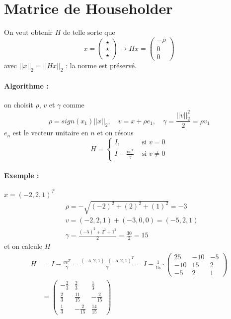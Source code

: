 \documentclass[a4paper,9pt]{extarticle}
\begin{document}
\section{Matrice de Householder}

On veut obtenir $H$ de telle sorte que
$$
x = \begin{pmatrix}
\star \\ \star \\ \star
\end{pmatrix}
\rightarrow
Hx = \begin{pmatrix}
-\rho \\ 0 \\ 0
\end{pmatrix}
$$
avec $||x||_2 = ||Hx||_2$ : la norme est préservé.

\paragraph*{Algorithme : } on choisit $\rho$, $v$ et $\gamma$ comme
$$
\rho = sign(x_1)||x||_2, \quad v = x + \rho e_1,\quad \gamma = \frac{||v||^2_2}{2} = \rho v_1
$$
$e_n$ est le vecteur unitaire en $n$ et on résous
$$
H = \begin{cases}
I, &\text{ si } v = 0 \\
I - \frac{vv^T}{\gamma} &\text{ si }v \neq 0
\end{cases}
$$

\paragraph*{Exemple : } $x=(-2,2,1)^T$
\begin{align*}
&\rho = -\sqrt{(-2)^2 + (2)^2 + (1)^2} = -3 \\
& v = (-2,2,1) + (-3,0,0) = (-5,2,1) \\
& \gamma = \frac{(-5)^2+2^2+1^2}{2} = \frac{30}{2} = 15
\end{align*}
et on calcule $H$
\begin{align*}
H &= I - \frac{vv^T}{\gamma} = \frac{(-5,2,1) \cdot (-5,2,1)^T}{\gamma} = I - 
\frac{1}{15} \cdot \begin{pmatrix}
25 & -10 & -5 \\
-10 & 15 & 2 \\
-5 & 2 & 1
\end{pmatrix}\\
&=
\begin{pmatrix}
-\frac{2}{3} & \frac{2}{3} & \frac{1}{3} \\
\frac{2}{3} & \frac{11}{15} & -\frac{2}{15} \\
\frac{1}{3} & -\frac{2}{15} & \frac{14}{15}
\end{pmatrix}
\end{align*}
\end{document}
